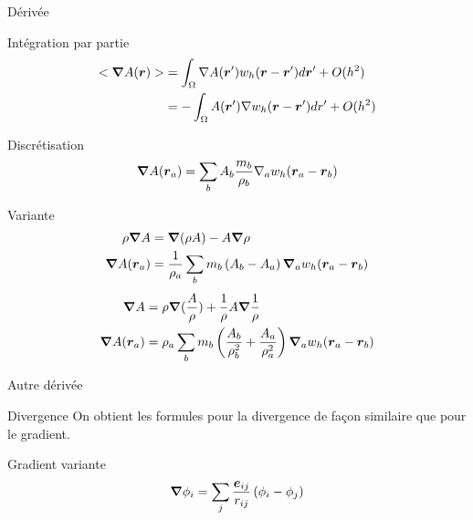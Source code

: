 \begin{frame}[<+->][shrink]{Dérivée}
 \begin{block}{Intégration par partie}
 \begin{align*}
  <{\boldsymbol {\nabla}} A({\boldsymbol {r}})>&=\int_{\Omega} \nabla A({\boldsymbol {r}}')w_{h}({\boldsymbol {r}}-{\boldsymbol {r}}')d{\boldsymbol {r}}'+O(h^2)\\
  &=-\int_{\Omega} A({\boldsymbol {r}}')\nabla w_{h}({\boldsymbol {r}}-{\boldsymbol {r}}')dr'+O(h^2)
 \end{align*}
\end{block}
\begin{block}{Discrétisation}
\begin{equation*}
 {\boldsymbol {\nabla}} A({\boldsymbol {r}}_a)=\sum_{b}A_b\frac{m_b}{\rho_b}\nabla_a w_{h}({\boldsymbol {r}}_a-{\boldsymbol {r}}_b)
 \end{equation*}
\end{block}
\begin{block}{Variante}
 \begin{align*}
  \rho{\boldsymbol {\nabla}} A&={\boldsymbol {\nabla}}(\rho A)-A{\boldsymbol {\nabla}} \rho\\
  {\boldsymbol {\nabla}} A({\boldsymbol {r}}_a)&=\frac{1}{\rho_a}\sum_{b}m_b \left(A_b-A_a\right) {\boldsymbol {\nabla}}_a w_{h}({\boldsymbol {r}}_a-{\boldsymbol {r}}_b)
 \end{align*}
\begin{align*}
 {\boldsymbol {\nabla}} A&=\rho{\boldsymbol {\nabla}}(\frac{A}{\rho})+\frac{1}{\rho}A{\boldsymbol {\nabla}} \frac{1}{\rho}\\
 {\boldsymbol {\nabla}} A({\boldsymbol {r}}_a)&=\rho_a\sum_{b} m_b\left(\frac{A_b}{\rho_b^2}+\frac{A_a}{\rho_a^2}\right) {\boldsymbol {\nabla}}_a w_{h}({\boldsymbol {r}}_a-{\boldsymbol {r}}_b)
\end{align*}

\end{block}


\end{frame}

\begin{frame}[<+->]{Autre dérivée}
 \begin{block}{Divergence}
  On obtient les formules pour la divergence de façon similaire que pour le gradient.
 \end{block}

 \begin{block}{Gradient variante}
 \begin{equation*}
  {\boldsymbol {\nabla}} \phi_{i}=\sum_{j}\frac{{\boldsymbol {e}}_{ij}}{r_{ij}}\left(\phi_{i}-\phi_{j}\right)
  \end{equation*}
 \end{block}

\end{frame}

